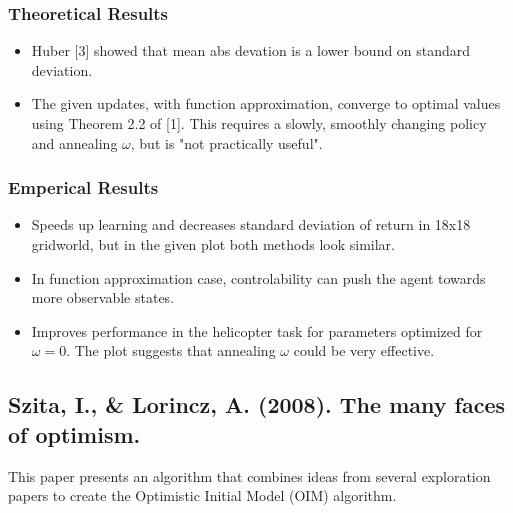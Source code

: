 \documentclass[12pt, oneside]{amsart}
\begin{document}
	\subsubsection*{Theoretical Results}
	\begin{itemize}
		\item Huber [3] showed that mean abs devation is a lower bound on standard deviation. 
		\item The given updates, with function approximation, converge to optimal values using Theorem 2.2 of [1]. This requires a slowly, smoothly changing policy and annealing $\omega$, but is "not practically useful".
	\end{itemize}
	
	\subsubsection*{Emperical Results} 
	\begin{itemize}
		\item Speeds up learning and decreases standard deviation of return in 18x18 gridworld, but in the given plot both methods look similar.
		\item In function approximation case, controlability can push the agent towards more observable states. 
		\item Improves performance in the helicopter task for parameters optimized for $\omega=0$. The plot suggests that annealing $\omega$ could be very effective. 
	\end{itemize}
	
	\subsection*{Szita, I., \& Lorincz, A. (2008). The many faces of optimism.}
	This paper presents an algorithm that combines ideas from several exploration papers to create the Optimistic Initial Model (OIM) algorithm.
	
\end{document}
